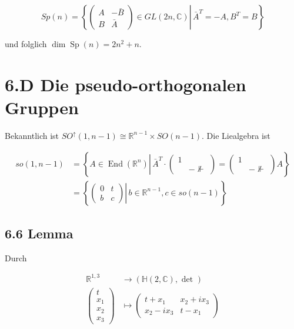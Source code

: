 \documentclass[10pt, letterpaper]{article}
\begin{document}
$$
S p(n)=\left\{\left.\left(\begin{array}{cc}
A & -\bar{B} \\
B & \bar{A}
\end{array}\right) \in G L(2 n, \mathbb{C}) \right\rvert\, \bar{A}^{T}=-A, B^{T}=B\right\}
$$

und folglich $\operatorname{dim} \operatorname{Sp}(n)=2 n^{2}+n$.

\section*{6.D Die pseudo-orthogonalen Gruppen}
Bekanntlich ist $S O^{\uparrow}(1, n-1) \cong \mathbb{R}^{n-1} \times S O(n-1)$. Die Liealgebra ist

$$
\begin{aligned}
s o(1, n-1) & =\left\{A \in \operatorname{End}\left(\mathbb{R}^{n}\right) \left\lvert\, \bar{A}^{T} \cdot\left(\begin{array}{cc}
1 & \\
& -\nVdash
\end{array}\right)=\left(\begin{array}{ll}
1 & \\
& -\nVdash
\end{array}\right) A\right.\right\} \\
& =\left\{\left.\left(\begin{array}{cc}
0 & t \\
b & c
\end{array}\right) \right\rvert\, b \in \mathbb{R}^{n-1}, c \in s o(n-1)\right\}
\end{aligned}
$$

\subsection*{6.6 Lemma}
Durch

$$
\begin{aligned}
\mathbb{R}^{1,3} & \rightarrow(\mathbb{H}(2, \mathbb{C}), \text { det }) \\
\left(\begin{array}{c}
t \\
x_{1} \\
x_{2} \\
x_{3}
\end{array}\right) & \mapsto\left(\begin{array}{cc}
t+x_{1} & x_{2}+i x_{3} \\
x_{2}-i x_{3} & t-x_{1}
\end{array}\right)
\end{aligned}
$$
\end{document}

